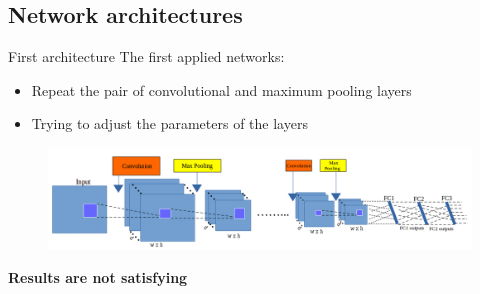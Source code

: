 \documentclass[10pt,svgnames]{beamer}
\begin{document}
\subsection{Network architectures}
\begin{frame}{First architecture}{}
	The first applied networks:
	\begin{itemize}
		\item Repeat the pair of {\color{conv}convolutional} and {\color{pool}maximum pooling} layers
		\item Trying to adjust the parameters of the layers
	\end{itemize}
	\begin{center}
   		\begin{figure}[htbp]
   			\centering
    		\includegraphics[scale=.28]{images/arch_cnn2}    
		\end{figure}
		\textbf{\color{red}Results are not satisfying}
   \end{center}
\end{frame}
\end{document}
